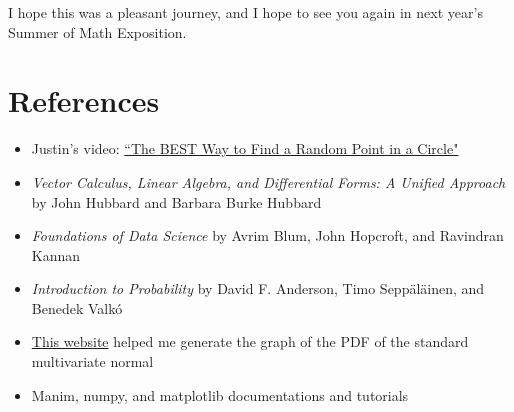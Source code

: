 \documentclass{article}
\begin{document}
I hope this was a pleasant journey, and I hope to see you again in next year's Summer of Math Exposition.

\section{References}

\begin{itemize}
    \item Justin's video: \href{https://www.youtube.com/watch?v=4y_nmpv-9lI&list=PLnQX-jgAF5pTkwtUuVpqS5tuWmJ-6ZM-Z&index=6&t=3s}{``The BEST Way to Find a Random Point in a Circle"}
    \item \textit{Vector Calculus, Linear Algebra, and Differential Forms: A Unified Approach} by John Hubbard and Barbara Burke Hubbard
    \item \textit{Foundations of Data Science} by Avrim Blum, John Hopcroft, and Ravindran Kannan
    \item \textit{Introduction to Probability} by David F. Anderson, Timo Sepp\"{a}l\"{a}inen, and Benedek Valk\'{o}
    \item \href{https://scipython.com/blog/visualizing-the-bivariate-gaussian-distribution/}{This website} helped me generate the graph of the PDF of the standard multivariate normal
    \item Manim, numpy, and matplotlib documentations and tutorials
\end{itemize}
\end{document}

